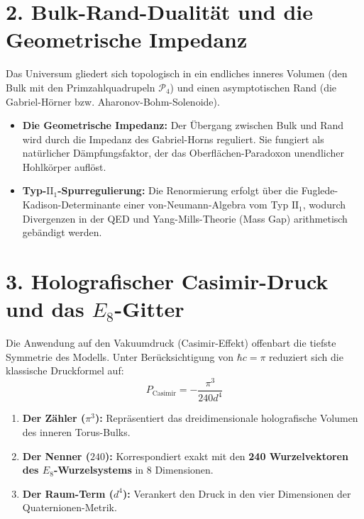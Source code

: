 \documentclass[11pt,a4paper]{article}
\begin{document}
\section{2. Bulk-Rand-Dualität und die Geometrische Impedanz}
Das Universum gliedert sich topologisch in ein endliches inneres Volumen (den Bulk mit den Primzahlquadrupeln $\mathcal{P}_4$) und einen asymptotischen Rand (die Gabriel-Hörner bzw. Aharonov-Bohm-Solenoide).
\begin{itemize}
    \item \textbf{Die Geometrische Impedanz:} Der Übergang zwischen Bulk und Rand wird durch die Impedanz des Gabriel-Horns reguliert. Sie fungiert als natürlicher Dämpfungsfaktor, der das Oberflächen-Paradoxon unendlicher Hohlkörper auflöst.
    \item \textbf{Typ-$\text{II}_1$-Spurregulierung:} Die Renormierung erfolgt über die Fuglede-Kadison-Determinante einer von-Neumann-Algebra vom Typ $\text{II}_1$, wodurch Divergenzen in der QED und Yang-Mills-Theorie (Mass Gap) arithmetisch gebändigt werden.
\end{itemize}

\section{3. Holografischer Casimir-Druck und das $E_8$-Gitter}
Die Anwendung auf den Vakuumdruck (Casimir-Effekt) offenbart die tiefste Symmetrie des Modells. Unter Berücksichtigung von $\hbar c = \pi$ reduziert sich die klassische Druckformel auf:
\begin{equation}
    P_{\text{Casimir}} = -\frac{\pi^3}{240 d^4}
\end{equation}
\begin{enumerate}
    \item \textbf{Der Zähler ($\pi^3$):} Repräsentiert das dreidimensionale holografische Volumen des inneren Torus-Bulks.
    \item \textbf{Der Nenner ($240$):} Korrespondiert exakt mit den \textbf{240 Wurzelvektoren des $E_8$-Wurzelsystems} in 8 Dimensionen.
    \item \textbf{Der Raum-Term ($d^4$):} Verankert den Druck in den vier Dimensionen der Quaternionen-Metrik.
\end{enumerate}
\end{document}
